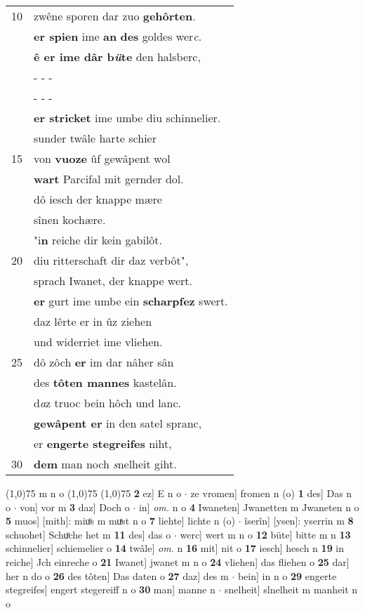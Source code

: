 \documentclass[8pt,a4paper,notitlepage]{article}
\begin{document}
\begin{table}[ht]
\begin{minipage}[t]{0.5\linewidth}
\begin{tabular}{rl}
10 & zwêne sporen dar zuo \textbf{gehôrten}.\\ 
 & \textbf{er spien} ime \textbf{an} \textbf{des} goldes wer\textit{c}.\\ 
 & \textbf{ê er ime dâr b\textit{ü}te} den halsberc,\\ 
 & \multicolumn{1}{l}{ - - - }\\ 
 & \multicolumn{1}{l}{ - - - }\\ 
 & \textbf{er stricket} ime umbe diu schinnelier.\\ 
 & sunder twâle harte schier\\ 
15 & von \textbf{vuoze} ûf gewâpent wol\\ 
 & \textbf{wart} Parcifal mit gernder dol.\\ 
 & dô iesch der knappe mære\\ 
 & sînen kochære.\\ 
 & "i\textbf{n} reiche dir kein gabilôt.\\ 
20 & diu ritterschaft dir daz verbôt",\\ 
 & sprach Iwanet, der knappe wert.\\ 
 & \textbf{er} gurt ime umbe ein \textbf{scharpfez} swert.\\ 
 & daz lêrte er in ûz ziehen\\ 
 & und widerriet ime vliehen.\\ 
25 & dô zôch \textbf{er} im dar nâher sân\\ 
 & des \textbf{tôten mannes} kastelân.\\ 
 & d\textit{a}z truoc bein hôch und lanc.\\ 
 & \textbf{gewâpent er} in den satel spranc,\\ 
 & er \textbf{en}\textbf{gerte stegreifes} niht,\\ 
30 & \textbf{dem} man noch \textit{s}nelheit giht.\\ 
\end{tabular}
\scriptsize
\line(1,0){75} \newline
m n o \newline
\line(1,0){75} \newline
\newline
\line(1,0){75} \newline
\textbf{2} ez] E n o  $\cdot$ ze vromen] fromen n (o) \textbf{1} des] Das n o  $\cdot$ von] vor m \textbf{3} daz] Doch o  $\cdot$ in] \textit{om.} n o \textbf{4} Iwaneten] Jwanetten m Jwaneten n o \textbf{5} muos] [mith]: miuͦs m muͯst n o \textbf{7} liehte] lichte n (o)  $\cdot$ îserîn] [ysen]: yserrin m \textbf{8} schuohet] Schuͦche het m \textbf{11} des] das o  $\cdot$ werc] wert m n o \textbf{12} büte] bitte m n \textbf{13} schinnelier] schiemelier o \textbf{14} twâle] \textit{om.} n \textbf{16} mit] nit o \textbf{17} iesch] hesch n \textbf{19} in reiche] Jch einreche o \textbf{21} Iwanet] jwanet m n o \textbf{24} vliehen] das fliehen o \textbf{25} dar] her n do o \textbf{26} des tôten] Das daten o \textbf{27} daz] des m  $\cdot$ bein] in n o \textbf{29} engerte stegreifes] engert stegereiff n o \textbf{30} man] manne n  $\cdot$ snelheit] slnelheit m manheit n o \newline
\end{minipage}
\end{table}
\end{document}

